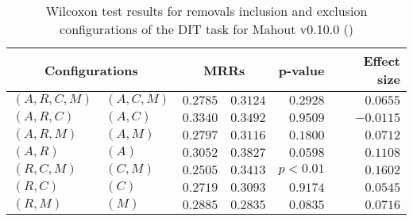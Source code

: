 
\begin{table}
\begin{spacing}{1.2}
\centering
\caption{Wilcoxon test results for removals inclusion and exclusion configurations of the DIT task for Mahout v0.10.0 (\ctwo)}
\label{table:versus-wilcox-mahout-dit-removals}
\begin{tabular}{ll|rr|rr}
\toprule
      \multicolumn{2}{c|}{Configurations} &                \multicolumn{2}{c|}{MRRs} &             p-value & Effect size \\
\midrule
 $(A,R,C,M)$ &  $(A,C,M)$ &       $0.2785$ &  $\bm{0.3124}$ & $0.2928$ &    $0.0655$ \\
   $(A,R,C)$ &    $(A,C)$ &       $0.3340$ &  $\bm{0.3492}$ & $0.9509$ &   $-0.0115$ \\
   $(A,R,M)$ &    $(A,M)$ &       $0.2797$ &  $\bm{0.3116}$ & $0.1800$ &    $0.0712$ \\
     $(A,R)$ &      $(A)$ &       $0.3052$ &  $\bm{0.3827}$ & $0.0598$ &    $0.1108$ \\
   $(R,C,M)$ &    $(C,M)$ &       $0.2505$ &  $\bm{0.3413}$ & $p<0.01$ &    $0.1602$ \\
     $(R,C)$ &      $(C)$ &       $0.2719$ &  $\bm{0.3093}$ & $0.9174$ &    $0.0545$ \\
     $(R,M)$ &      $(M)$ &  $\bm{0.2885}$ &       $0.2835$ & $0.0835$ &    $0.0716$ \\
\bottomrule
\end{tabular}

\end{spacing}
\end{table}

